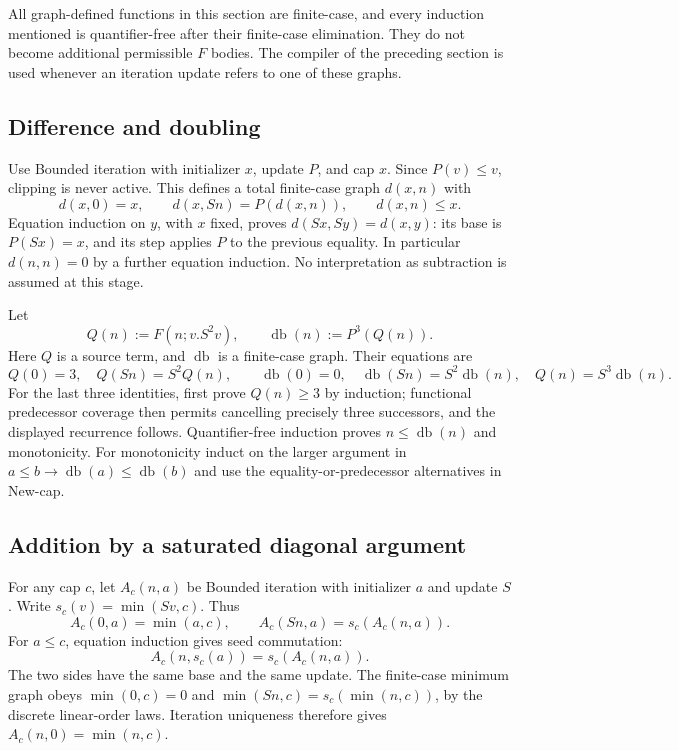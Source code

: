 \documentclass[11pt,letterpaper]{article}
\theoremstyle{definition}\newtheorem{definition}[theorem]{Definition}
\theoremstyle{remark}\newtheorem{remark}[theorem]{Remark}
\begin{document}
All graph-defined functions in this section are finite-case, and every
induction mentioned is quantifier-free after their finite-case
elimination. They do not become additional permissible $F$ bodies.
The compiler of the preceding section is used whenever an iteration
update refers to one of these graphs.

\subsection{Difference and doubling}
Use Bounded iteration with initializer $x$, update $P$, and cap $x$.
Since $P(v)\le v$, clipping is never active. This defines a total
finite-case graph $d(x,n)$ with
\[
d(x,0)=x,\qquad d(x,Sn)=P(d(x,n)),\qquad d(x,n)\le x.
\]
Equation induction on $y$, with $x$ fixed, proves
$d(Sx,Sy)=d(x,y)$: its base is $P(Sx)=x$, and its step applies $P$
to the previous equality. In particular $d(n,n)=0$ by a further
equation induction. No interpretation as subtraction is assumed
at this stage.

Let
\[
 Q(n):=F(n;v.S^2v),\qquad \operatorname{db}(n):=P^3(Q(n)).
\]
Here $Q$ is a source term, and $\operatorname{db}$ is a finite-case
graph. Their equations are
\[
 Q(0)=3,\quad Q(Sn)=S^2Q(n),\qquad
 \operatorname{db}(0)=0,\quad
 \operatorname{db}(Sn)=S^2\operatorname{db}(n),\quad
 Q(n)=S^3\operatorname{db}(n).
\]
For the last three identities, first prove $Q(n)\ge3$ by induction;
functional predecessor coverage then permits cancelling precisely
three successors, and the displayed recurrence follows. Quantifier-free
induction proves $n\le\operatorname{db}(n)$ and monotonicity. For
monotonicity induct on the larger argument in
$a\le b\to\operatorname{db}(a)\le\operatorname{db}(b)$ and use
the equality-or-predecessor alternatives in New-cap.

\subsection{Addition by a saturated diagonal argument}
For any cap $c$, let $A_c(n,a)$ be Bounded iteration with initializer
$a$ and update $S$. Write $s_c(v)=\min(Sv,c)$. Thus
\[
 A_c(0,a)=\min(a,c),\qquad A_c(Sn,a)=s_c(A_c(n,a)).
\]
For $a\le c$, equation induction gives seed commutation:
\[
                  A_c(n,s_c(a))=s_c(A_c(n,a)).
 \tag{Seed commute}
\]
The two sides have the same base and the same update. The finite-case
minimum graph obeys $\min(0,c)=0$ and
$\min(Sn,c)=s_c(\min(n,c))$, by the discrete linear-order laws.
Iteration uniqueness therefore gives
$A_c(n,0)=\min(n,c)$.
\end{document}
